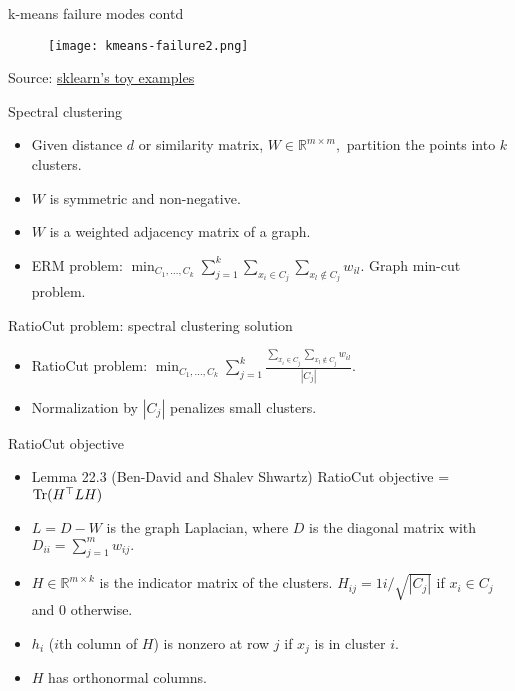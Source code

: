 \documentclass[final]{beamer}
\begin{document}
\begin{frame}{k-means failure modes contd}
	\begin{figure}
	\texttt{[image: kmeans-failure2.png]}
	\end{figure}

	Source: \href{https://scikit-learn.org/stable/auto_examples/cluster/plot_kmeans_assumptions.html\#sphx-glr-auto-examples-cluster-plot-kmeans-assumptions-py}{sklearn's toy examples}
\end{frame}
\begin{frame}{Spectral clustering}
	\begin{itemize}
		\item Given distance $d$ or similarity matrix, $W \in \mathbb{R}^{m\times m},$ partition the points into $k$ clusters.
		\pause
		\item $W$ is symmetric and non-negative.
		\pause
		\item $W$ is a weighted adjacency matrix of a graph.
		\pause
		\item ERM problem: $\min_{C_1, \ldots, C_k} \sum_{j=1}^k \sum_{x_i \in C_j} \sum_{x_l \notin C_j} w_{il}.$ Graph min-cut problem.
	\end{itemize}
\end{frame}
\begin{frame}{RatioCut problem: spectral clustering solution}
	\begin{itemize}
		\item RatioCut problem: $\min_{C_1, \ldots, C_k} \sum_{j=1}^k \frac{\sum_{x_i \in C_j} \sum_{x_l \notin C_j} w_{il}}{|C_j|}.$
		\pause
		\item Normalization by $|C_j|$ penalizes small clusters.
		\pause

	\end{itemize}

\end{frame}
\begin{frame}{RatioCut objective}
	\begin{itemize}
\item Lemma 22.3 (Ben-David and Shalev Shwartz) RatioCut objective = ${\rm Tr}(H^\top L H)$
\pause
	\item $L = D - W$ is the graph Laplacian, where $D$ is the diagonal matrix with $D_{ii} = \sum_{j=1}^m w_{ij}.$
	\pause
\item $H \in \mathbb{R}^{m\times k}$ is the indicator matrix of the clusters. $H_{ij} = 1i/\sqrt{|C_j|}$ if $x_i \in C_j$ and $0$ otherwise.
	\pause
	\item $h_i$ ($i$th column of $H$) is nonzero at row $j$ if $x_j$ is in cluster $i$. 
	\pause
	\item $H$ has orthonormal columns.
	\end{itemize}
\end{frame}
\end{document}
